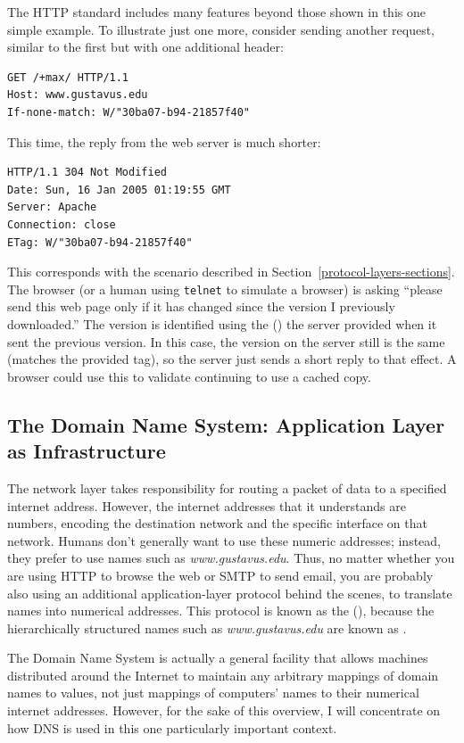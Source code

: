 The HTTP standard includes many features beyond those shown in this
one simple example.  To illustrate just one more, consider
sending another request, similar to the first but with one additional
header:
\begin{verbatim}
GET /+max/ HTTP/1.1
Host: www.gustavus.edu
If-none-match: W/"30ba07-b94-21857f40"

\end{verbatim}
This time, the reply from the web server is much shorter:
\begin{verbatim}
HTTP/1.1 304 Not Modified
Date: Sun, 16 Jan 2005 01:19:55 GMT
Server: Apache
Connection: close
ETag: W/"30ba07-b94-21857f40"

\end{verbatim}
This corresponds with the scenario described in
Section~\ref{protocol-layers-sections}.  The browser (or a human using
\verb|telnet| to simulate a browser) is asking ``please send this web page
only if it has changed since the version I previously downloaded.''
The version is identified using the  () the server provided when it sent the previous
version.  In this case, the version on the server still is the same
(matches the provided tag), so the server just sends a short reply to
that effect.  A browser could use this to validate continuing to use a
cached copy.

\subsection{The Domain Name System: Application Layer as
  Infrastructure}\label{dns-section}

The network layer takes responsibility for routing a packet of data to
a specified internet address.  However, the internet addresses that it
understands are numbers, encoding the destination network and the
specific interface on that network.  Humans don't generally want to
use these numeric addresses; instead, they prefer to use names such as
\textit{www.gustavus.edu}.  Thus, no matter whether you are using HTTP to
browse the web or SMTP to send email,
you are probably also using an additional application-layer
protocol behind the scenes, to translate names into numerical
addresses.  This protocol is known as the  (), because the hierarchically structured names such as
\textit{www.gustavus.edu} are known as .

The Domain Name System is actually a general facility that allows
machines distributed around the Internet to maintain any arbitrary
mappings of domain names to values, not just mappings of computers'
names to their numerical internet addresses.  However, for the
sake of this overview, I will concentrate on how DNS is used in this
one particularly important context.

